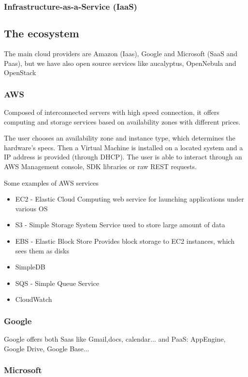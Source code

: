 \documentclass[12pt, a4paper]{article}
\begin{document}
\subsubsection{ Infrastructure-as-a-Service (IaaS)}


\subsection{The ecosystem}
The main cloud providers are Amazon (Iaas), Google and Microsoft (SaaS and Paas), but we have also open source
services like aucalyptus, OpenNebula and OpenStack

\subsubsection{AWS}
Composed of interconnected servers with high speed connection, it offers computing and storage services based on 
availability zones with different prices.

The user chooses an availability zone and instance type, which determines the hardware's specs. Then a Virtual 
Machine is installed on a located system and a IP address is provided (through DHCP). The user is able to interact
through an AWS Management console, SDK libraries or raw REST requests.

Some examples of AWS services
\begin{itemize}
    \item EC2 - Elastic Cloud Computing
    \subitem web service for launching applications under various OS
    \item S3 - Simple Storage System
    \subitem Service used to store large amount of data
    \item EBS - Elastic Block Store
    \subitem Provides block storage to EC2 instances, which sees them as disks
    \item SimpleDB
    \item SQS - Simple Queue Service
    \item CloudWatch
\end{itemize}

\subsubsection{Google}
Google offers both Saas like Gmail,docs, calendar... and PaaS: AppEngine, Google Drive, Google Base...

\subsubsection{Microsoft}
\end{document}

